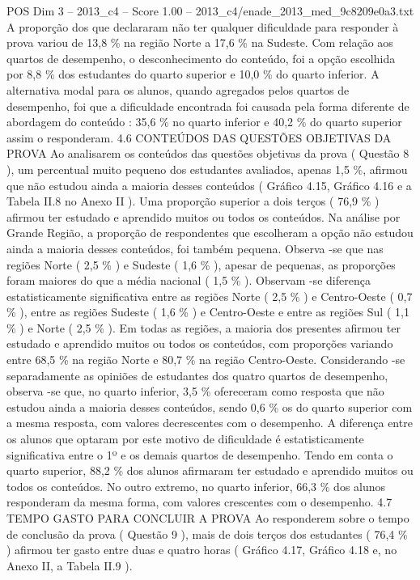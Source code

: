 \begin{textsample}{POS Dim 3 – 2013\_c4 – Score 1.00 – 2013\_c4/enade\_2013\_med\_9c8209e0a3.txt}
A proporção dos que declararam não ter qualquer dificuldade para responder à prova variou de 13,8 \% na região Norte a 17,6 \% na Sudeste.
Com relação aos quartos de desempenho, o desconhecimento do conteúdo, foi a opção escolhida por 8,8 \% dos estudantes do quarto superior e 10,0 \% do quarto inferior.
A alternativa modal para os alunos, quando agregados pelos quartos de desempenho, foi que a dificuldade encontrada foi causada pela forma diferente de abordagem do conteúdo : 35,6 \% no quarto inferior e 40,2 \% do quarto superior assim o responderam. 4.6 CONTEÚDOS DAS QUESTÕES OBJETIVAS DA PROVA Ao analisarem os conteúdos das questões objetivas da prova ( Questão 8 ), um percentual muito pequeno dos estudantes avaliados, apenas 1,5 \%, afirmou que não estudou ainda a maioria desses conteúdos ( Gráfico 4.15, Gráfico 4.16 e a Tabela II.8 no Anexo II ).
Uma proporção superior a dois terços ( 76,9 \% ) afirmou ter estudado e aprendido muitos ou todos os conteúdos.
Na análise por Grande Região, a proporção de respondentes que escolheram a opção não estudou ainda a maioria desses conteúdos, foi também pequena.
Observa -se que nas regiões Norte ( 2,5 \% ) e Sudeste ( 1,6 \% ), apesar de pequenas, as proporções foram maiores do que a média nacional ( 1,5 \% ).
Observam -se diferença estatisticamente significativa entre as regiões Norte ( 2,5 \% ) e Centro-Oeste ( 0,7 \% ), entre as regiões Sudeste ( 1,6 \% ) e Centro-Oeste e entre as regiões Sul ( 1,1 \% ) e Norte ( 2,5 \% ).
Em todas as regiões, a maioria dos presentes afirmou ter estudado e aprendido muitos ou todos os conteúdos, com proporções variando entre 68,5 \% na região Norte e 80,7 \% na região Centro-Oeste.
Considerando -se separadamente as opiniões de estudantes dos quatro quartos de desempenho, observa -se que, no quarto inferior, 3,5 \% ofereceram como resposta que não estudou ainda a maioria desses conteúdos, sendo 0,6 \% os do quarto superior com a mesma resposta, com valores decrescentes com o desempenho.
A diferença entre os alunos que optaram por este motivo de dificuldade é estatisticamente significativa entre o 1º e os demais quartos de desempenho.
Tendo em conta o quarto superior, 88,2 \% dos alunos afirmaram ter estudado e aprendido muitos ou todos os conteúdos.
No outro extremo, no quarto inferior, 66,3 \% dos alunos responderam da mesma forma, com valores crescentes com o desempenho. 4.7 TEMPO GASTO PARA CONCLUIR A PROVA Ao responderem sobre o tempo de conclusão da prova ( Questão 9 ), mais de dois terços dos estudantes ( 76,4 \% ) afirmou ter gasto entre duas e quatro horas ( Gráfico 4.17, Gráfico 4.18 e, no Anexo II, a Tabela II.9 ).

\end{textsample}
